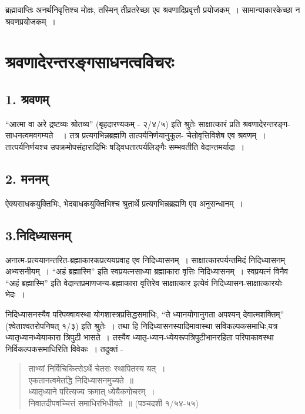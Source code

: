 {ब्रह्मावाप्तिः अनर्थनिवृत्तिश्च 	मोक्षः, तस्मिन् तीव्रतरेच्छा 	एव श्रवणादिप्रवृत्तौ प्रयोजकम्~।  सामान्याकारकेच्छा न श्रवणप्रयोजकम्~। 

\section*{श्रवणादेरन्तरङ्गसाधनत्वविचरः}

\subsection*{1. श्रवणम्} 

“आत्मा वा अरे द्रष्टव्यः श्रोतव्य” (बृहदारण्यकम् - २/४/५) इति श्रुतेः साक्षात्कारं प्रति श्रवणादेरन्तरङ्ग-साधनत्वमवगम्यते~~। तत्र प्रत्यगभिन्नब्रह्मणि तात्पर्यनिर्णयानुकूल- चेतोवृत्तिविशेष एव श्रवणम्~। तात्पर्यनिर्णयश्च उपक्रमोपसंहारादिभिः षड्विधतात्पर्यलिङ्गैः सम्भवतीति वेदान्तमर्यादा~। 

\subsection*{2. मननम् }

ऐक्यसाधकयुक्तिभिः, भेदबाधकयुक्तिभिश्च श्रुतार्थे प्रत्यगभिन्नब्रह्मणि एव अनुसन्धानम्~। 

\subsection*{3.निदिध्यासनम् }

अनात्म-प्रत्ययानन्तरित-ब्रह्माकारकप्रत्ययप्रवाह एव निदिध्यासनम्~। साक्षात्कारपर्यन्तमिदं निदिध्यासनम् अभ्यसनीयम्~। “अहं ब्रह्मास्मि” इति स्वप्रयत्नसाध्या ब्रह्माकारा वृत्तिः निदिध्यासनम्~। स्वप्रयत्नं विनैव “अहं ब्रह्मास्मि” इति वेदान्तप्रमाणजन्य-ब्रह्माकारा वृत्तिरेव साक्षात्कार इत्येवं निदिध्यासन-साक्षात्कारयोः भेदः~। 

निदिध्यासनस्यैव परिपक्वावस्था योगशास्त्रप्रसिद्धसमाधिः, “ते ध्यानयोगानुगता अपश्यन् देवात्मशक्तिम्” (श्वेताश्वतरोपनिषत् १/३) इति श्रुतेः~। तथा हि निदिध्यासनस्यादिमावास्था सविकल्पकसमाधिः,यत्र ध्यातृध्यानध्येयाकारा त्रिपुटी भासते~। तस्यैव ध्यातृ-ध्यान-ध्येयरूपत्रिपुटीभानरहिता परिपाकावस्था निर्विकल्पकसमाधिरिति विवेकः~। तदुक्तं - 

\begin{verse}
ताभ्यां निर्विचिकित्सेऽर्थे चेतसः स्थापितस्य यत्~। \\
एकतानत्वमेतद्धि निदिध्यासनमुच्यते~॥ \\
ध्यातृध्याने परित्यज्य क्रमात् ध्येयैकगोचरम्~। \\ 
निवातदीपवच्चित्तं समाधिरभिधीयते~॥ (पञ्चदशी १/५४-५५)
\end{verse}

}
